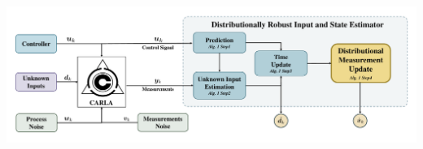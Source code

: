 \documentclass[handout, aspectratio=169]{beamer}
\begin{document}
\begin{frame}
    \frametitle{}
    \begin{center}
        \includegraphics[width=\textwidth]{figs/BlockDiagram.pdf} %
    \end{center}
\end{frame}
\end{document}
